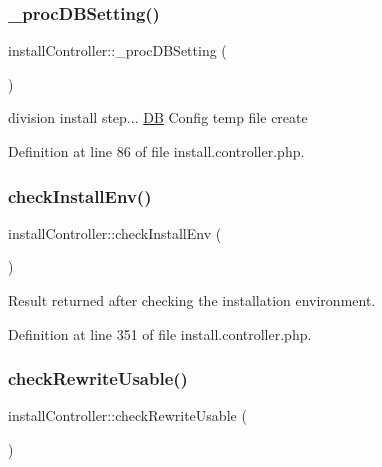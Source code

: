 \subsubsection{\texorpdfstring{\+\_\+proc\+D\+B\+Setting()}{\_procDBSetting()}}
{\footnotesize\ttfamily install\+Controller\+::\+\_\+proc\+D\+B\+Setting (\begin{DoxyParamCaption}{ }\end{DoxyParamCaption})}



division install step... \hyperlink{classDB}{DB} Config temp file create 



Definition at line 86 of file install.\+controller.\+php.

\mbox{\label{classinstallController_a6cd48bffa15badc616c0b860c59d410e}} 
\subsubsection{\texorpdfstring{check\+Install\+Env()}{checkInstallEnv()}}
{\footnotesize\ttfamily install\+Controller\+::check\+Install\+Env (\begin{DoxyParamCaption}{ }\end{DoxyParamCaption})}



Result returned after checking the installation environment. 



Definition at line 351 of file install.\+controller.\+php.

\mbox{\label{classinstallController_ae621886c36c43926d81f6beb56cfde25}} 
\subsubsection{\texorpdfstring{check\+Rewrite\+Usable()}{checkRewriteUsable()}}
{\footnotesize\ttfamily install\+Controller\+::check\+Rewrite\+Usable (\begin{DoxyParamCaption}{ }\end{DoxyParamCaption})}

